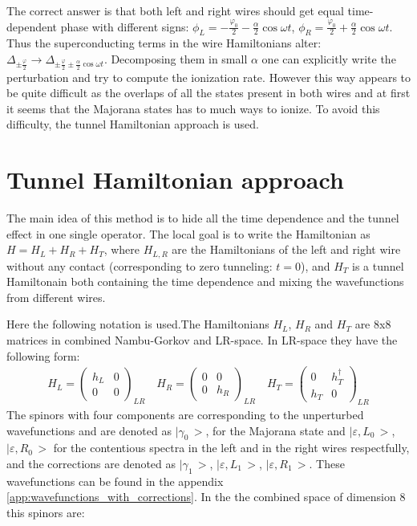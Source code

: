 The correct answer is that both left and right wires should get equal time-dependent phase with different signs: $ \phi_L=-\frac{\varphi_0}{2}-\frac{\alpha}{2}\cos \omega t $, $ \phi_R=\frac{\varphi_0}{2}+\frac{\alpha}{2}\cos \omega t $. Thus the superconducting terms in the wire Hamiltonians alter: $ \Delta_{\pm\frac{\varphi}{2}} \to\Delta_{\pm\frac{\varphi}{2}\pm \frac{\alpha}{2}\cos \omega t} $. Decomposing them in small $ \alpha $ one can explicitly write the perturbation and try to compute the ionization rate. However this way appears to be quite difficult as the overlaps of all the states 
present in both wires and at first it seems that the Majorana states has to much ways to ionize. To avoid this difficulty, the tunnel Hamiltonian approach is used.
\section{Tunnel Hamiltonian approach}
\label{sec:tunnel_hamiltonian}
The main idea of this method is to hide all the time dependence and the tunnel effect in one single operator. The local goal is to write the Hamiltonian as $ H=H_L+H_R+H_T $, where $ H_{L,R} $ are the Hamiltonians of the left and right wire without any contact (corresponding to zero tunneling: $ t=0 $), and $H_T  $ is a tunnel Hamiltonain both containing the time dependence and mixing the wavefunctions from different wires. 

Here the following notation is used.The Hamiltonians $ H_L $, $ H_R $ and $ H_T $ are 8x8 matrices in combined Nambu-Gorkov and LR-space. In LR-space they have the following form:
\begin{gather}
	H_L
	=
	\begin{pmatrix}
	h_L & 0 \\
	0 & 0
	\end{pmatrix}_{LR}
	\quad
	H_R
=
\begin{pmatrix}
0 & 0 \\
0 & h_R
\end{pmatrix}_{LR}
\quad
	H_T
=
\begin{pmatrix}
0 & h_T^\dagger \\
h_T & 0
\end{pmatrix}_{LR}	
\end{gather}
 The spinors with four components are corresponding to the unperturbed wavefunctions and are denoted as $ \big|\gamma_{0}\,\big> $,  for the Majorana state and $ \big|\varepsilon,L_{0}\,\big> $, $ \big|\varepsilon,R_{0}\,\big> $ for the contentious spectra in the left and in the right wires respectfully, and the corrections are denoted as $ \big|\gamma_{1}\,\big> $, $ \big|\varepsilon,L_{1}\,\big> $, $ \big|\varepsilon,R_{1}\,\big> $. These wavefunctions can be found in the appendix \ref{app:wavefunctions_with_corrections}.  In the the combined space of dimension 8 this spinors are:


